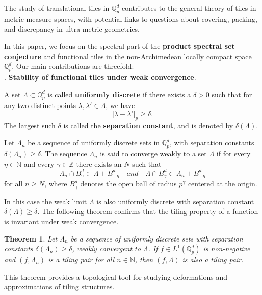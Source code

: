 \documentclass[a4paper,12pt]{amsart}
\newtheorem{theorem}{Theorem}[section]
\def\N{\mathbb{N}}
\def\Z{\mathbb{Z}}
\def\Q{\mathbb{Q}}
\def\Qp{\mathbb{Q}_p}
\begin{document}
The study of translational tiles in $\Qp^d$ contributes to the general theory of tiles in metric measure
spaces, with potential links to questions about covering, packing, and discrepancy in ultra-metric geometries.

In this paper, we focus on the spectral part of the {\bf product spectral set conjecture}  and functional tiles
in the  non-Archimedean locally compact space $\mathbb{Q}_p^d$. Our main contributions are threefold:\\
. {\bf Stability of functional tiles under weak convergence}.

A set \(\Lambda \subset \mathbb{Q}_p^d\) is called \textbf{uniformly discrete} if there exists a \(\delta >0\)
such that for any two distinct points \(\lambda, \lambda' \in \Lambda\), we have
\[
|\lambda - \lambda'|_p \ge \delta.
\]
The largest such \(\delta\) is called the \textbf{separation constant}, and is denoted by \(\delta(\Lambda)\).


Let $\Lambda_n$ be a sequence of uniformly discrete sets in $\Qp^d$, with separation constants
$\delta(\Lambda_n)\ge \delta$. The sequence $\Lambda_n$ is said to converge weakly to a set $\Lambda$
if for every $\eta\in\N$ and every $\gamma\in\Z$ there exists an $N$ such that
$$
\Lambda_n\cap B_{\gamma}^d\subset \Lambda+ B_{-\eta}^d \quad and \quad \Lambda\cap B_{\gamma}^d\subset \Lambda_n+ B_{-\eta}^d
$$
for all $n\geq N$, where $B_{\gamma}^d$ denotes the open ball of radius $p^{\gamma}$ centered at the origin.

In this case the weak limit $\Lambda$ is also uniformly discrete with separation
constant $\delta(\Lambda)\ge \delta$.
The following theorem confirms that the tiling property of a function is invariant under weak convergence.
\begin{theorem}\label{weak convergence}
Let $\Lambda_n$ be a sequence of uniformly discrete sets  with separation constants
$\delta(\Lambda_n)\ge \delta$, weakly convergent to $\Lambda$. If $f\in L^1(\Q_p^d)$ is non-negative
and $(f, \Lambda_n)$ is a tiling pair for all $n\in\N$, then $(f, \Lambda)$ is also a tiling pair.
\end{theorem}

This theorem provides a topological tool for studying deformations and
approximations of tiling structures.
\end{document}

